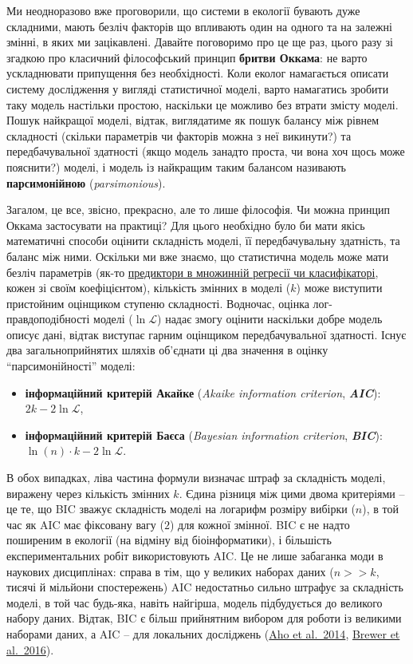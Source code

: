 \documentclass[
  11pt,
]{book}
\begin{document}
Ми неодноразово вже проговорили, що системи в екології бувають дуже складними, мають безліч факторів що впливають один на одного та на залежні змінні, в яких ми зацікавлені. Давайте поговоримо про це ще раз, цього разу зі згадкою про класичний філософський принцип \textbf{бритви Оккама}: не варто ускладнювати припущення без необхідності. Коли еколог намагається описати систему дослідження у вигляді статистичної моделі, варто намагатись зробити таку модель настільки простою, наскільки це можливо без втрати змісту моделі. Пошук найкращої моделі, відтак, виглядатиме як пошук балансу між рівнем складності (скільки параметрів чи факторів можна з неї викинути?) та передбачувальної здатності (якщо модель занадто проста, чи вона хоч щось може пояснити?) моделі, і модель із найкращим таким балансом називають \textbf{парсимонійною} (\emph{parsimonious}).

Загалом, це все, звісно, прекрасно, але то лише філософія. Чи можна принцип Оккама застосувати на практиці? Для цього необхідно було би мати якісь математичні способи оцінити складність моделі, її передбачувальну здатність, та баланс між ними. Оскільки ми вже знаємо, що статистична модель може мати безліч параметрів (як-то \hyperref[regression]{предиктори в множинній регресії чи класифікаторі}, кожен зі своїм коефіцієнтом), кількість змінних в моделі (\(k\)) може виступити пристойним оцінщиком ступеню складності. Водночас, оцінка лог-правдоподібності моделі (\(\ln\mathcal{L}\)) надає змогу оцінити наскільки добре модель описує дані, відтак виступає гарним оцінщиком передбачувальної здатності. Існує два загальноприйнятих шляхів об'єднати ці два значення в оцінку ``парсимонійності'' моделі:

\begin{itemize}
\item
  \textbf{інформаційний критерій Акайке} (\emph{Akaike information criterion}, \textbf{\emph{AIC}}): \(2k-2\ln\mathcal{L}\),
\item
  \textbf{інформаційний критерій Баєса} (\emph{Bayesian information criterion}, \textbf{\emph{BIC}}): \(\ln (n) \cdot k - 2\ln\mathcal{L}\).
\end{itemize}

В обох випадках, ліва частина формули визначає штраф за складність моделі, виражену через кількість змінних \(k\). Єдина різниця між цими двома критеріями -- це те, що BIC зважує складність моделі на логарифм розміру вибірки (\(n\)), в той час як AIC має фіксовану вагу (\(2\)) для кожної змінної. BIC є не надто поширеним в екології (на відміну від біоінформатики), і більшість експериментальних робіт використовують AIC. Це не лише забаганка моди в наукових дисциплінах: справа в тім, що у великих наборах даних (\(n >> k\), тисячі й мільйони спостережень) AIC недостатньо сильно штрафує за складність моделі, в той час будь-яка, навіть найгірша, модель підбудується до великого набору даних. Відтак, BIC є більш прийнятним вибором для роботи із великими наборами даних, а AIC -- для локальних досліджень (\href{https://biol607.github.io/readings/Aho_2014_ecolog_bic.pdf}{Aho et al.~2014}, \href{https://doi.org/10.1111/2041-210X.12541}{Brewer et al.~2016}).
\end{document}
